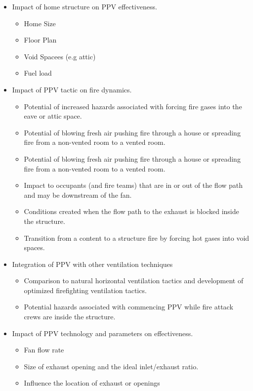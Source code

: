 \documentclass{article}
\begin{document}
\begin{itemize}
	\item Impact of home structure on PPV effectiveness.
	\begin{itemize}
		\item Home Size
		\item Floor Plan
		\item Void Spacees (e.g attic)
		\item Fuel load
	\end{itemize}
	\item Impact of PPV tactic on fire dynamics.
	\begin{itemize}
		\item Potential of increased hazards associated with forcing fire gases into the eave or attic space.
		\item Potential of blowing fresh air pushing fire through a house or spreading fire from a non-vented room to a vented room.
		\item Potential of blowing fresh air pushing fire through a house or spreading fire from a non-vented room to a vented room.
		\item Impact to occupants (and fire teams) that are in or out of the flow path and may be downstream of the fan.
		\item Conditions created when the flow path to the exhaust is blocked inside the structure.
		\item Transition from a content to a structure fire by forcing hot gases into void spaces.
	\end{itemize}
	\item Integration of PPV with other ventilation techniques
	\begin{itemize}
		\item Comparison to natural horizontal ventilation tactics and development of optimized firefighting ventilation tactics.
		\item Potential hazards associated with commencing PPV while fire attack crews are inside the structure.
	\end{itemize}
	\item Impact of PPV technology and parameters on effectiveness.
	\begin{itemize}
		\item Fan flow rate
		\item Size of exhaust opening and the ideal inlet/exhaust ratio.
		\item Influence the location of exhaust or openings
	\end{itemize}
\end{itemize}
\end{document}
